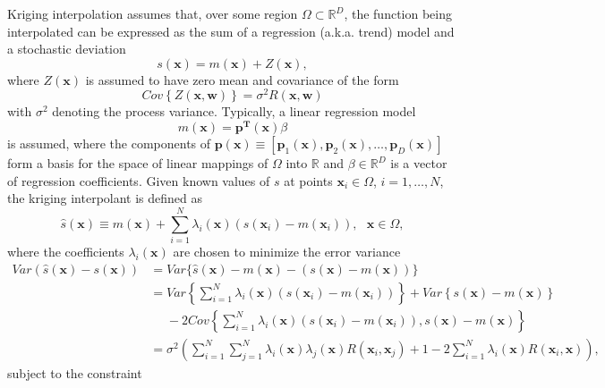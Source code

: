 \documentclass[12pt]{article}
\begin{document}
Kriging interpolation assumes that, over some region $\Omega \subset \mathbb{R}^D$, the function being interpolated can
be expressed as the sum of a regression (a.k.a.  trend) model and a
stochastic deviation
\begin{equation}
s(\mathbf{x}) = m(\mathbf{x}) + Z(\mathbf{x}),
\end{equation}
where $Z(\mathbf{x})$ is assumed to have zero mean and covariance of
the form
\begin{equation}
Cov\left \{ Z(\mathbf{x}, \mathbf{w}) \right \} = \sigma^2 R(\mathbf{x},\mathbf{w})
\end{equation}
with $\sigma^2$ denoting the process variance.  Typically, a linear
regression model
\begin{equation}
m(\mathbf{x}) = \mathbf{p^T}(\mathbf{x}) \beta
\end{equation}
is assumed, where the components of $\mathbf{p(x)} \equiv [
  \mathbf{p}_1\mathbf{(x)},\mathbf{p}_2\mathbf{(x)}, \ldots,
  \mathbf{p}_D\mathbf{(x)}]$ form a basis for the space of linear mappings of
  $\Omega$ into $\mathbb{R}$ and $\beta \in \mathbb{R}^D$ is a vector of regression coefficients.  Given known values of $s$ at points $\mathbf{x}_i \in \Omega$,
$i=1,\ldots,N$, the kriging interpolant is defined as
\begin{equation}
\hat{s}(\mathbf{x}) \equiv m(\mathbf{x}) + \sum_{i=1}^N \lambda_i(\mathbf{x})
(s(\mathbf{x}_i) - m(\mathbf{x}_i)), ~~~ \mathbf{x} \in \Omega, \label{stardef}
\end{equation}
where the coefficients $\lambda_i(\mathbf{x})$ are chosen to minimize the error variance 
\begin{align}
Var(\hat{s}(\mathbf{x}) - s(\mathbf{x})) &= Var\{ \hat{s}(\mathbf{x}) -
  m(\mathbf{x}) - (s(\mathbf{x}) - m(\mathbf{x})) \}
  \label{errorvariance} \\
\nonumber & = Var \left \{  \sum_{i=1}^N \lambda_i(\mathbf{x}) ( s(\mathbf{x}_i) -
  m(\mathbf{x}_i)) \right \} + Var \left \{ s(\mathbf{x}) - m(\mathbf{x})
  \right \} \\
\nonumber & ~~~~~~ - 2 Cov \left \{ \sum_{i=1}^N \lambda_i(\mathbf{x}) ( s(\mathbf{x}_i) -
  m(\mathbf{x}_i)), s(\mathbf{x}) - m(\mathbf{x}) \right \} \\
\nonumber & = \sigma^2 \left ( \sum_{i=1}^N \sum_{j=1}^N \lambda_i(\mathbf{x}) \lambda_j(\mathbf{x}) R(\mathbf{x}_i,\mathbf{x}_j)
  + 1 - 2 \sum_{i=1}^N \lambda_i(\mathbf{x}) R(\mathbf{x}_i,\mathbf{x}) \right ),
\end{align}
subject to the constraint
\end{document}
